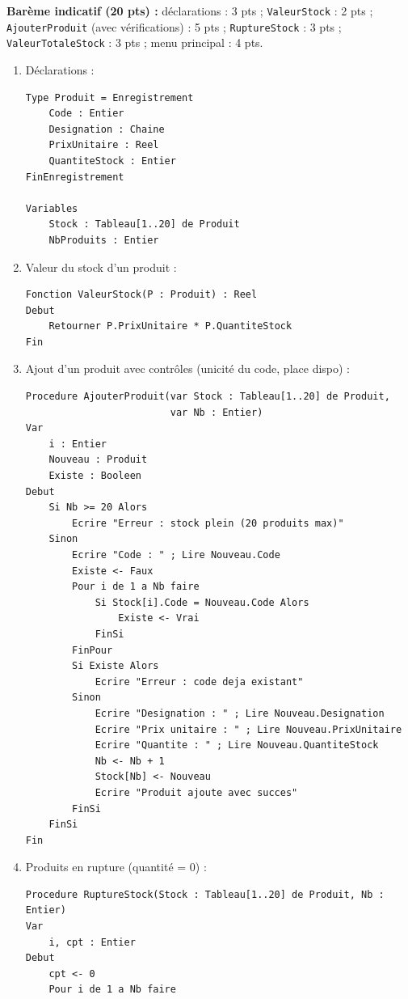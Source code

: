 \documentclass[11pt]{article}
\begin{document}
\begin{corrige}
\textbf{Barème indicatif (20 pts) :} déclarations : 3 pts ; \texttt{ValeurStock} : 2 pts ; \texttt{AjouterProduit} (avec vérifications) : 5 pts ; \texttt{RuptureStock} : 3 pts ; \texttt{ValeurTotaleStock} : 3 pts ; menu principal : 4 pts.

\begin{enumerate}
    \item Déclarations :
\begin{lstlisting}
Type Produit = Enregistrement
    Code : Entier
    Designation : Chaine
    PrixUnitaire : Reel
    QuantiteStock : Entier
FinEnregistrement

Variables
    Stock : Tableau[1..20] de Produit
    NbProduits : Entier
\end{lstlisting}
    \item Valeur du stock d'un produit :
\begin{lstlisting}
Fonction ValeurStock(P : Produit) : Reel
Debut
    Retourner P.PrixUnitaire * P.QuantiteStock
Fin
\end{lstlisting}
    \item Ajout d'un produit avec contrôles (unicité du code, place dispo) :
\begin{lstlisting}
Procedure AjouterProduit(var Stock : Tableau[1..20] de Produit,
                         var Nb : Entier)
Var
    i : Entier
    Nouveau : Produit
    Existe : Booleen
Debut
    Si Nb >= 20 Alors
        Ecrire "Erreur : stock plein (20 produits max)"
    Sinon
        Ecrire "Code : " ; Lire Nouveau.Code
        Existe <- Faux
        Pour i de 1 a Nb faire
            Si Stock[i].Code = Nouveau.Code Alors
                Existe <- Vrai
            FinSi
        FinPour
        Si Existe Alors
            Ecrire "Erreur : code deja existant"
        Sinon
            Ecrire "Designation : " ; Lire Nouveau.Designation
            Ecrire "Prix unitaire : " ; Lire Nouveau.PrixUnitaire
            Ecrire "Quantite : " ; Lire Nouveau.QuantiteStock
            Nb <- Nb + 1
            Stock[Nb] <- Nouveau
            Ecrire "Produit ajoute avec succes"
        FinSi
    FinSi
Fin
\end{lstlisting}
    \item Produits en rupture (quantité = 0) :
\begin{lstlisting}
Procedure RuptureStock(Stock : Tableau[1..20] de Produit, Nb : Entier)
Var
    i, cpt : Entier
Debut
    cpt <- 0
    Pour i de 1 a Nb faire

\end{lstlisting}
\end{enumerate}
\end{corrige}
\end{document}

